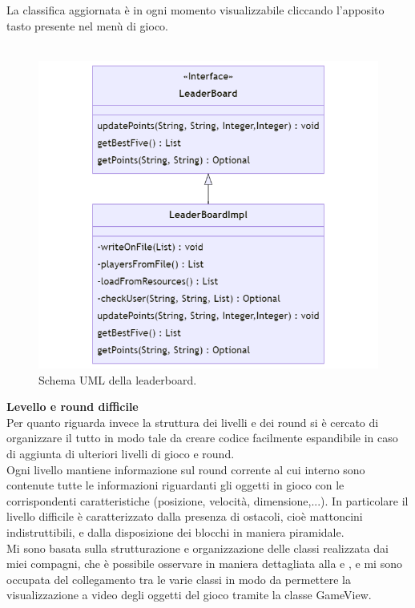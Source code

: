 \documentclass[a4paper,12pt]{report}
\begin{document}
La classifica aggiornata è in ogni momento visualizzabile cliccando l'apposito tasto presente nel menù di gioco.\\\\
\begin{figure}[H]
    \centering{}
    \includegraphics[scale=0.6]{images/leaderboard.png}
    \caption{Schema UML della leaderboard.}
    \label{images:leaderboard}
\end{figure}
\pagebreak
\textbf{Levello e round difficile}\\
Per quanto riguarda invece la struttura dei livelli e dei round si è cercato di organizzare il tutto in modo tale da creare codice facilmente espandibile in caso di aggiunta di ulteriori livelli di gioco e round.
\\Ogni livello mantiene informazione sul round corrente al cui interno sono contenute tutte le informazioni riguardanti gli oggetti in gioco con le corrispondenti caratteristiche (posizione, velocità, dimensione,...).
In particolare il livello difficile è caratterizzato dalla presenza di ostacoli, cioè mattoncini indistruttibili, e dalla disposizione dei blocchi in maniera piramidale.
\\Mi sono basata sulla strutturazione e organizzazione delle classi realizzata dai miei compagni, che è possibile osservare in maniera dettagliata alla  e , e mi sono occupata del collegamento tra le varie classi in modo da permettere la visualizzazione a video degli oggetti del gioco tramite la classe GameView.\\\\
\pagebreak
\end{document}
